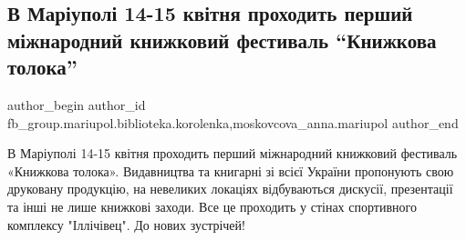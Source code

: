  
 
 
 
 

\subsection{В Маріуполі 14-15 квітня проходить перший міжнародний книжковий фестиваль \enquote{Книжкова толока}}
\label{sec:15_04_2018.fb.fb_group.mariupol.biblioteka.korolenka.1.v_mar_upol__14_15_kv}
 
\ifcmt
 author_begin
   author_id fb_group.mariupol.biblioteka.korolenka,moskovcova_anna.mariupol
 author_end
\fi

В Маріуполі 14-15 квітня проходить перший міжнародний книжковий фестиваль
«Книжкова толока». Видавництва та книгарні зі всієї України пропонують свою
друковану продукцію, на невеликих локаціях відбуваються дискусії, презентації
та інші не лише книжкові заходи. Все це проходить у стінах спортивного
комплексу "Іллічівец". До нових зустрічей!
